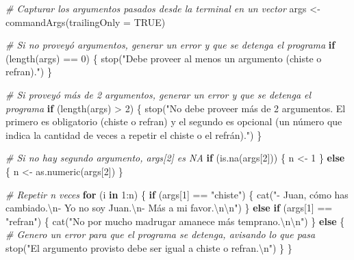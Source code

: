 \documentclass[
]{book}
\newenvironment{Shaded}{\begin{snugshade}}{\end{snugshade}}
\newcommand{\AttributeTok}[1]{\textcolor[rgb]{0.77,0.63,0.00}{#1}}
\newcommand{\CommentTok}[1]{\textcolor[rgb]{0.56,0.35,0.01}{\textit{#1}}}
\newcommand{\ConstantTok}[1]{\textcolor[rgb]{0.00,0.00,0.00}{#1}}
\newcommand{\ControlFlowTok}[1]{\textcolor[rgb]{0.13,0.29,0.53}{\textbf{#1}}}
\newcommand{\DecValTok}[1]{\textcolor[rgb]{0.00,0.00,0.81}{#1}}
\newcommand{\FunctionTok}[1]{\textcolor[rgb]{0.00,0.00,0.00}{#1}}
\newcommand{\NormalTok}[1]{#1}
\newcommand{\OtherTok}[1]{\textcolor[rgb]{0.56,0.35,0.01}{#1}}
\newcommand{\SpecialCharTok}[1]{\textcolor[rgb]{0.00,0.00,0.00}{#1}}
\newcommand{\StringTok}[1]{\textcolor[rgb]{0.31,0.60,0.02}{#1}}
\begin{document}
\begin{Shaded}
\begin{Highlighting}[]
\CommentTok{\# Capturar los argumentos pasados desde la terminal en un vector}
\NormalTok{args }\OtherTok{\textless{}{-}} \FunctionTok{commandArgs}\NormalTok{(}\AttributeTok{trailingOnly =} \ConstantTok{TRUE}\NormalTok{)}

\CommentTok{\# Si no proveyó argumentos, generar un error y que se detenga el programa}
\ControlFlowTok{if}\NormalTok{ (}\FunctionTok{length}\NormalTok{(args) }\SpecialCharTok{==} \DecValTok{0}\NormalTok{) \{}
    \FunctionTok{stop}\NormalTok{(}\StringTok{"Debe proveer al menos un argumento (chiste o refran)."}\NormalTok{)}
\NormalTok{\}}

\CommentTok{\# Si proveyó más de 2 argumentos, generar un error y que se detenga el programa}
\ControlFlowTok{if}\NormalTok{ (}\FunctionTok{length}\NormalTok{(args) }\SpecialCharTok{\textgreater{}} \DecValTok{2}\NormalTok{) \{}
    \FunctionTok{stop}\NormalTok{(}\StringTok{"No debe proveer más de 2 argumentos. El primero es obligatorio (chiste o refran) y el segundo es opcional (un número que indica la cantidad de veces a repetir el chiste o el refrán)."}\NormalTok{)}
\NormalTok{\}}

\CommentTok{\# Si no hay segundo argumento, args[2] es NA}
\ControlFlowTok{if}\NormalTok{ (}\FunctionTok{is.na}\NormalTok{(args[}\DecValTok{2}\NormalTok{])) \{}
\NormalTok{    n }\OtherTok{\textless{}{-}} \DecValTok{1}
\NormalTok{\} }\ControlFlowTok{else}\NormalTok{ \{}
\NormalTok{    n }\OtherTok{\textless{}{-}} \FunctionTok{as.numeric}\NormalTok{(args[}\DecValTok{2}\NormalTok{])}
\NormalTok{\}}

\CommentTok{\# Repetir n veces}
\ControlFlowTok{for}\NormalTok{ (i }\ControlFlowTok{in} \DecValTok{1}\SpecialCharTok{:}\NormalTok{n) \{}
    \ControlFlowTok{if}\NormalTok{ (args[}\DecValTok{1}\NormalTok{] }\SpecialCharTok{==} \StringTok{"chiste"}\NormalTok{) \{}
        \FunctionTok{cat}\NormalTok{(}\StringTok{"{-} Juan, cómo has cambiado.}\SpecialCharTok{\textbackslash{}n}\StringTok{{-} Yo no soy Juan.}\SpecialCharTok{\textbackslash{}n}\StringTok{{-} Más a mi favor.}\SpecialCharTok{\textbackslash{}n\textbackslash{}n}\StringTok{"}\NormalTok{)}
\NormalTok{    \} }\ControlFlowTok{else} \ControlFlowTok{if}\NormalTok{ (args[}\DecValTok{1}\NormalTok{] }\SpecialCharTok{==} \StringTok{"refran"}\NormalTok{) \{}
        \FunctionTok{cat}\NormalTok{(}\StringTok{"No por mucho madrugar amanece más temprano.}\SpecialCharTok{\textbackslash{}n\textbackslash{}n}\StringTok{"}\NormalTok{)}
\NormalTok{    \} }\ControlFlowTok{else}\NormalTok{ \{}
        \CommentTok{\# Genero un error para que el programa se detenga, avisando lo que pasa}
        \FunctionTok{stop}\NormalTok{(}\StringTok{"El argumento provisto debe ser igual a chiste o refran.}\SpecialCharTok{\textbackslash{}n}\StringTok{"}\NormalTok{)}
\NormalTok{    \}}
\NormalTok{\}}
\end{Highlighting}
\end{Shaded}
\end{document}
